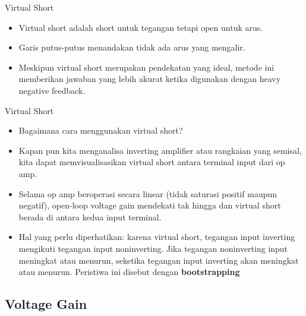 \begin{frame}{Virtual Short}
	\begin{itemize}
		\item Virtual short adalah short untuk tegangan tetapi open untuk arus.
		\item Garis putus-putus menandakan tidak ada arus yang mengalir.
		\item Meskipun virtual short merupakan pendekatan yang ideal, metode ini memberikan jawaban yang lebih akurat ketika digunakan dengan heavy negative feedback.
	\end{itemize}
\end{frame}

\begin{frame}{Virtual Short}
	\begin{itemize}
		\item Bagaimana cara menggunakan virtual short?
		\item Kapan pun kita menganalisa inverting amplifier atau rangkaian yang semisal, kita dapat memvisualisasikan virtual short antara terminal input dari op amp.
		\item Selama op amp beroperasi secara linear (tidak saturasi positif maupun negatif), open-loop voltage gain mendekati tak hingga dan virtual short berada di antara kedua input terminal.
		\item Hal yang perlu diperhatikan: karena virtual short, tegangan input inverting mengikuti tegangan input noninverting. Jika tegangan noninverting input meningkat atau menurun, seketika tegangan input inverting akan meningkat atau menurun. Peristiwa ini disebut dengan \textbf{bootstrapping}
	\end{itemize}
\end{frame}



\subsection{Voltage Gain}

